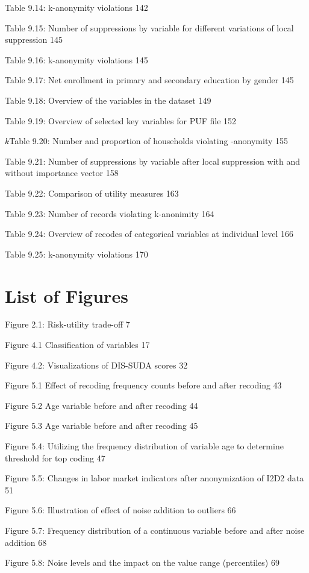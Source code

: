 \documentclass[letterpaper,10pt,english]{sphinxmanual}
\begin{document}
Table 9.14: k-anonymity violations 142

Table 9.15: Number of suppressions by variable for different variations
of local suppression 145

Table 9.16: k-anonymity violations 145

Table 9.17: Net enrollment in primary and secondary education by gender
145

Table 9.18: Overview of the variables in the dataset 149

Table 9.19: Overview of selected key variables for PUF file 152

\(k\)Table 9.20: Number and proportion of households violating
-anonymity 155

Table 9.21: Number of suppressions by variable after local suppression
with and without importance vector 158

Table 9.22: Comparison of utility measures 163

Table 9.23: Number of records violating k-anonimity 164

Table 9.24: Overview of recodes of categorical variables at individual
level 166

Table 9.25: k-anonymity violations 170


\chapter{List of Figures}
\label{\detokenize{lists:list-of-figures}}
Figure 2.1: Risk-utility trade-off 7

Figure 4.1 Classification of variables 17

Figure 4.2: Visualizations of DIS-SUDA scores 32

Figure 5.1 Effect of recoding \textendash{} frequency counts before and after
recoding 43

Figure 5.2 Age variable before and after recoding 44

Figure 5.3 Age variable before and after recoding 45

Figure 5.4: Utilizing the frequency distribution of variable age to
determine threshold for top coding 47

Figure 5.5: Changes in labor market indicators after anonymization of
I2D2 data 51

Figure 5.6: Illustration of effect of noise addition to outliers 66

Figure 5.7: Frequency distribution of a continuous variable before and
after noise addition 68

Figure 5.8: Noise levels and the impact on the value range (percentiles)
69
\end{document}
